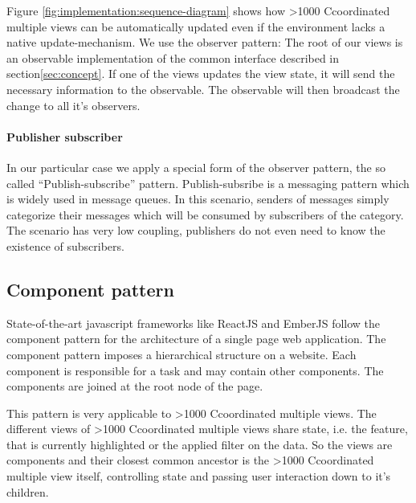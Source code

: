 \documentclass{article}
\newcommand\hmm[1]{\ifnum\ifhmode\spacefactor\else2000\fi>1000 \uppercase{#1}\else#1\fi}
\newcommand{\cmv}{\hmm{c}oordinated multiple view}
\newcommand{\cmvs}{\hmm{c}oordinated multiple views}
\begin{document}
Figure \ref{fig:implementation:sequence-diagram} shows how \cmvs{} can be automatically updated even if the environment lacks a native update-mechanism.
We use the observer pattern:
The root of our views is an observable implementation of the common interface described in section\ref{sec:concept}.
If one of the views updates the view state, it will send the necessary information to the observable.
The observable will then broadcast the change to all it's observers.


\paragraph{Publisher subscriber}
In our particular case we apply a special form of the observer pattern, the so called ``Publish-subscribe'' pattern\cite{Eugster2003}.
Publish-subsribe is a messaging pattern which is widely used in message queues.
In this scenario, senders of messages simply categorize their messages which will be consumed by subscribers of the category.
The scenario has very low coupling, publishers do not even need to know the existence of subscribers.


\subsection{Component pattern}
State-of-the-art javascript frameworks like ReactJS and EmberJS follow the component pattern for the architecture of a single page web application.
The component pattern imposes a hierarchical structure on a website.
Each component is responsible for a task and may contain other components.
The components are joined at the root node of the page.

This pattern is very applicable to \cmvs{}.
The different views of \cmvs{} share state, i.e. the feature, that is currently highlighted or the applied filter on the data.
So the views are components and their closest common ancestor is the \cmv{} itself, controlling state and passing user interaction down to it's children.
\end{document}
